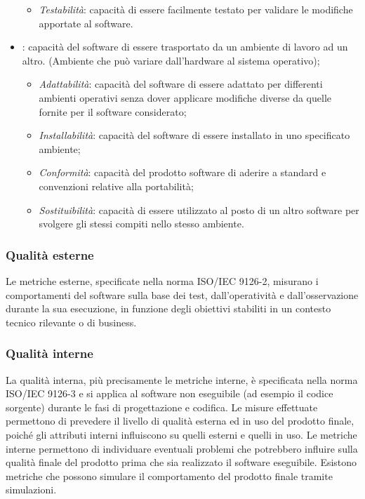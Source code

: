 \begin{itemize}
\begin{itemize}
			\item \emph{Testabilità}: capacità di essere facilmente testato per validare le modifiche apportate al software.
		\end{itemize}
	\item {}: capacità del software di essere trasportato da un ambiente di lavoro ad un altro. (Ambiente che può variare dall'hardware al sistema operativo);
		\begin{itemize}
			\item \emph{Adattabilità}: capacità del software di essere adattato per differenti ambienti operativi senza dover applicare modifiche diverse da quelle fornite per il software considerato;
			\item \emph{Installabilità}: capacità del software di essere installato in uno specificato ambiente;
			\item \emph{Conformità}: capacità del prodotto software di aderire a standard e convenzioni relative alla portabilità;
			\item \emph{Sostituibilità}: capacità di essere utilizzato al posto di un altro software per svolgere gli stessi compiti nello stesso ambiente.
		\end{itemize}
	\end{itemize}
	
\subsubsection{Qualità esterne} %

Le metriche esterne, specificate nella norma ISO/IEC 9126-2, misurano i comportamenti del software sulla base dei test, dall'operatività e dall'osservazione durante la sua esecuzione, in funzione degli obiettivi stabiliti in un contesto tecnico rilevante o di business.

\subsubsection{Qualità interne} %

La qualità interna, più precisamente le metriche interne, è specificata nella norma ISO/IEC 9126-3 e si applica al software non eseguibile (ad esempio il codice sorgente) durante le fasi di progettazione e codifica. Le misure effettuate permettono di prevedere il livello di qualità esterna ed in uso del prodotto finale, poiché gli attributi interni influiscono su quelli esterni e quelli in uso. Le metriche interne permettono di individuare eventuali problemi che potrebbero influire sulla qualità finale del prodotto prima che sia realizzato il software eseguibile. Esistono metriche che possono simulare il comportamento del prodotto finale tramite simulazioni.

